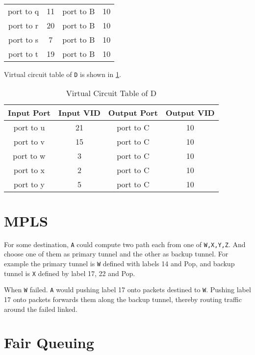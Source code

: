 \documentclass[12pt,titlepage,letterpaper]{article}
\begin{document}
\begin{enumerate}
\begin{enumerate}
\begin{table}[H]
\begin{tabular}{cccc}
                    port to q & 11 & port to B & 10 \\
                    port to r & 20 & port to B & 10 \\
                    port to s & 7 & port to B & 10 \\
                    port to t & 19 & port to B & 10 \\\hline
                \end{tabular}
            \end{table}
        Virtual circuit table of \texttt{D} is shown in \cref{d}.
            \begin{table}[H]
                \caption{Virtual Circuit Table of D}\label{d}\centering
                \begin{tabular}{cccc}\hline
                    Input Port & Input VID & Output Port & Output VID \\\hline
                    port to u & 21 & port to C & 10 \\
                    port to v & 15 & port to C & 10 \\
                    port to w & 3 & port to C & 10 \\
                    port to x & 2 & port to C & 10 \\
                    port to y & 5 & port to C & 10 \\\hline
                \end{tabular}
            \end{table}
    \end{enumerate}
\end{enumerate}

\section{MPLS}

For some destination, \texttt{A} could compute two path each from one of
\texttt{W,X,Y,Z}. And choose one of them as primary tunnel and the other as
backup tunnel. For example the primary tunnel is \texttt{W} defined with labels
14 and Pop, and backup tunnel is \texttt{X} defined by label 17, 22 and
Pop.

When \texttt{W} failed. \texttt{A} would pushing label 17 onto packets destined
to \texttt{W}. Pushing label 17 onto packets forwards them along the backup
tunnel, thereby routing traffic around the failed linked.

\section{Fair Queuing}
\end{document}
